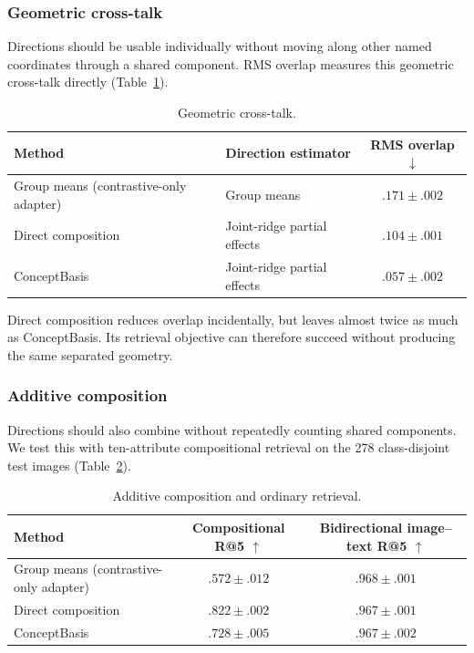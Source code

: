 \documentclass[mlmain,onecolumn]{jmlr}
\begin{document}
\subsubsection{Geometric cross-talk}

Directions should be usable individually without moving along other named coordinates through a shared component. RMS overlap measures this geometric cross-talk directly (Table~\ref{tab:cross-talk}).

\begin{table}[h!]
  \centering
  \caption{Geometric cross-talk.}
  \label{tab:cross-talk}
  \small
  \begin{tabular}{@{}p{} p{} c@{}}
    \toprule
    Method & Direction estimator & RMS overlap $\downarrow$ \\
    \midrule
    Group means (contrastive-only adapter) & Group means & $.171 \pm .002$ \\
    Direct composition & Joint-ridge partial effects & $.104 \pm .001$ \\
    ConceptBasis & Joint-ridge partial effects & $\mathbf{.057 \pm .002}$ \\
    \bottomrule
  \end{tabular}
\end{table}

Direct composition reduces overlap incidentally, but leaves almost twice as much as ConceptBasis. Its retrieval objective can therefore succeed without producing the same separated geometry.

\subsubsection{Additive composition}

Directions should also combine without repeatedly counting shared components. We test this with ten-attribute compositional retrieval on the 278 class-disjoint test images (Table~\ref{tab:additive-composition}).

\begin{table}[h!]
  \centering
  \caption{Additive composition and ordinary retrieval.}
  \label{tab:additive-composition}
  \small
  \begin{tabular}{@{}p{} c c@{}}
    \toprule
    Method & Compositional R@5 $\uparrow$ & Bidirectional image--text R@5 $\uparrow$ \\
    \midrule
    Group means (contrastive-only adapter) & $.572 \pm .012$ & $.968 \pm .001$ \\
    Direct composition & $\mathbf{.822 \pm .002}$ & $.967 \pm .001$ \\
    ConceptBasis & $.728 \pm .005$ & $.967 \pm .002$ \\
    \bottomrule
  \end{tabular}
\end{table}
\end{document}
